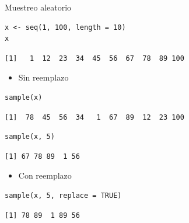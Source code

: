 \documentclass[xcolor={usenames,svgnames,dvipsnames}]{beamer}
\begin{document}
\begin{frame}[fragile,label=sec-3-7]{Muestreo aleatorio}
 \lstset{language=R,label= ,caption= ,numbers=none}
\begin{lstlisting}
x <- seq(1, 100, length = 10)
x
\end{lstlisting}

\begin{verbatim}
[1]   1  12  23  34  45  56  67  78  89 100
\end{verbatim}

\begin{itemize}
\item Sin reemplazo
\end{itemize}
\lstset{language=R,label= ,caption= ,numbers=none}
\begin{lstlisting}
sample(x)
\end{lstlisting}

\begin{verbatim}
[1]  78  45  56  34   1  67  89  12  23 100
\end{verbatim}

\lstset{language=R,label= ,caption= ,numbers=none}
\begin{lstlisting}
sample(x, 5)
\end{lstlisting}

\begin{verbatim}
[1] 67 78 89  1 56
\end{verbatim}

\begin{itemize}
\item Con reemplazo
\end{itemize}
\lstset{language=R,label= ,caption= ,numbers=none}
\begin{lstlisting}
sample(x, 5, replace = TRUE)
\end{lstlisting}

\begin{verbatim}
[1] 78 89  1 89 56
\end{verbatim}
\end{frame}
\end{document}
